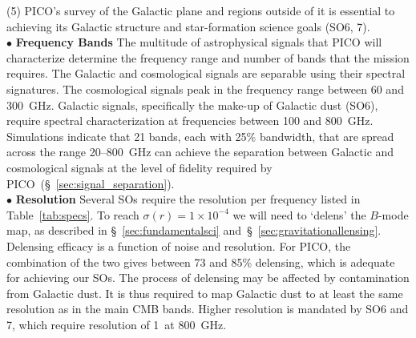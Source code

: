 \documentclass[PICOAPC.tex]{subfiles}
\begin{document}
(5) PICO's survey of the Galactic plane and regions outside of it is essential to achieving its Galactic structure  and star-formation science goals (SO6, 7). \\
%
$\bullet$ {\bf Frequency Bands} \hspace{0.1in} The multitude of astrophysical signals that PICO will characterize determine the frequency range and number of bands that the mission requires. The Galactic and cosmological signals are separable using their spectral signatures. The cosmological signals peak in the frequency range between 60 and 300~GHz. Galactic signals, specifically the make-up of Galactic dust (SO6), require spectral characterization at frequencies between 100 and 800~GHz. Simulations indicate that 21 bands, each with 25\% bandwidth, that are spread across the range 20--800~GHz can achieve the separation between Galactic and cosmological signals at the level of fidelity required by PICO~(\S~\ref{sec:signal_separation}). \\
%
$\bullet$ {\bf Resolution} \hspace{0.1in} 
Several \ac{SOs} require the resolution per frequency listed in Table~\ref{tab:specs}. To reach $\sigma(r) = 1\times10^{-4}$ we will need to `delens' the $B$-mode map, as described in \S~\ref{sec:fundamentalsci} and~\S~\ref{sec:gravitationallensing}. Delensing efficacy is a function of noise and resolution. For PICO, the combination of the two gives between 73 and 85\% delensing, which is adequate for achieving our \ac{SOs}. The process of delensing may be affected by contamination from Galactic dust. It is thus required to map Galactic dust to at least the same resolution as in the main CMB bands.  Higher resolution is mandated by SO6 and 7, which require resolution of 1\arcmin\ at 800~GHz. 
\end{document}
